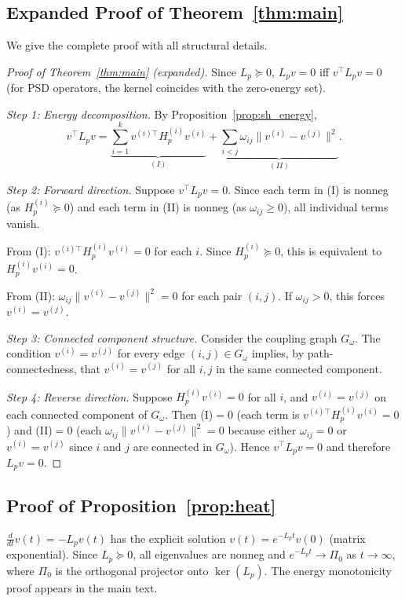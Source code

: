 \documentclass[11pt]{article}
\theoremstyle{definition}
\theoremstyle{remark}
\newcommand{\Gom}{G_\omega}
\begin{document}
\subsection{Expanded Proof of Theorem~\ref{thm:main}}

We give the complete proof with all structural details.

\begin{proof}[Proof of Theorem~\ref{thm:main} (expanded)]
Since $L_p\succeq 0$, $L_p v=0$ iff $v^\top L_p v = 0$ (for PSD operators,
the kernel coincides with the zero-energy set).

\textit{Step 1: Energy decomposition.} By Proposition~\ref{prop:sh_energy},
\[
  v^\top L_p v = \underbrace{\sum_{i=1}^k v^{(i)\top}H_p^{(i)}v^{(i)}}_{(I)}
  + \underbrace{\sum_{i<j}\omega_{ij}\|v^{(i)}-v^{(j)}\|^2}_{(II)}.
\]

\textit{Step 2: Forward direction.} Suppose $v^\top L_p v=0$. Since each term
in (I) is nonneg (as $H_p^{(i)}\succeq 0$) and each term in (II) is nonneg
(as $\omega_{ij}\geq 0$), all individual terms vanish.

From (I): $v^{(i)\top}H_p^{(i)}v^{(i)}=0$ for each $i$. Since
$H_p^{(i)}\succeq 0$, this is equivalent to $H_p^{(i)}v^{(i)}=0$.

From (II): $\omega_{ij}\|v^{(i)}-v^{(j)}\|^2=0$ for each pair $(i,j)$. If
$\omega_{ij}>0$, this forces $v^{(i)}=v^{(j)}$.

\textit{Step 3: Connected component structure.} Consider the coupling graph
$\Gom$. The condition $v^{(i)}=v^{(j)}$ for every edge $(i,j)\in\Gom$ implies,
by path-connectedness, that $v^{(i)}=v^{(j)}$ for all $i,j$ in the same
connected component.

\textit{Step 4: Reverse direction.} Suppose $H_p^{(i)}v^{(i)}=0$ for all $i$,
and $v^{(i)}=v^{(j)}$ on each connected component of $\Gom$. Then (I)$=0$
(each term is $v^{(i)\top}H_p^{(i)}v^{(i)}=0$) and (II)$=0$ (each
$\omega_{ij}\|v^{(i)}-v^{(j)}\|^2=0$ because either $\omega_{ij}=0$ or
$v^{(i)}=v^{(j)}$ since $i$ and $j$ are connected in $\Gom$). Hence
$v^\top L_p v=0$ and therefore $L_p v=0$.
\end{proof}

\subsection{Proof of Proposition~\ref{prop:heat}}

$\frac{d}{dt}v(t) = -L_p v(t)$ has the explicit solution
$v(t)=e^{-L_p t}v(0)$ (matrix exponential). Since $L_p\succeq 0$, all
eigenvalues are nonneg and $e^{-L_p t}\to\Pi_0$ as $t\to\infty$, where
$\Pi_0$ is the orthogonal projector onto $\ker(L_p)$. The energy monotonicity
proof appears in the main text.
\end{document}
